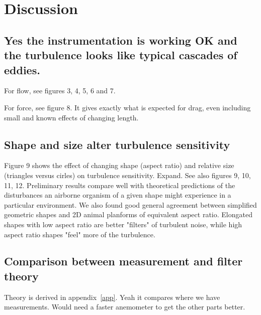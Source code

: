 \documentclass{jfm}
\begin{document}
\section{Discussion}

\subsection{Yes the instrumentation is working OK and the turbulence looks like typical cascades of eddies.}
For flow, see figures 3, 4, 5, 6 and 7. 

For force, see figure 8.  It gives exactly what is expected for drag, even including small and known effects of changing length.

\subsection{Shape and size alter turbulence sensitivity}
Figure 9 shows the effect of changing shape (aspect ratio) and relative size (triangles versus cirles) on turbulence sensitivity.  Expand. See also figures 9, 10, 11, 12. Preliminary results compare well with theoretical predictions of the disturbances an airborne organism of a given shape might experience in a particular environment.  We also found good general agreement between simplified geometric shapes and 2D animal planforms of equivalent aspect ratio.  Elongated shapes with low aspect ratio are better "filters" of turbulent noise, while high aspect ratio shapes "feel" more of the turbulence.

\subsection{Comparison between measurement and filter theory}
Theory is derived in appendix~\ref{app}.  Yeah it compares where we have measurements.  Would need a faster anemometer to get the other parts better. 
\end{document}
